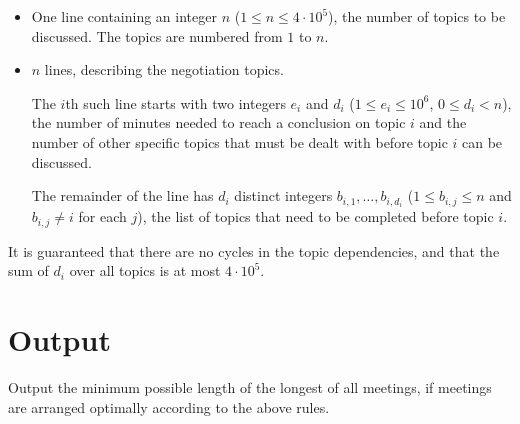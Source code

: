 \begin{itemize}
\item One line containing an integer $n$ ($1 \leq n \leq 4 \cdot 10^5$), the number of topics to be discussed.
      The topics are numbered from $1$ to $n$.

\item $n$ lines, describing the negotiation topics.

      The $i$th such line starts with two integers $e_i$ and $d_i$ ($1 \leq e_i \leq
10^6$, $0 \leq d_i < n$), the number of minutes needed to reach a conclusion on
topic $i$ and the number of other specific topics that must be dealt with before
topic $i$ can be discussed.

      The remainder of the line has $d_i$ distinct integers $b_{i,1}, \ldots, b_{i,d_{i}}$ ($1 \le b_{i,j} \le n$ and $b_{i,j} \ne i$ for each $j$), the list of topics that need to be completed before topic $i$.
\end{itemize}
It is guaranteed that there are no cycles in the topic dependencies, and that the sum of $d_i$ over all topics is at most $4 \cdot 10^5$.

\section*{Output}
Output the minimum possible length of the longest of all meetings, if meetings
are arranged optimally according to the above rules.
